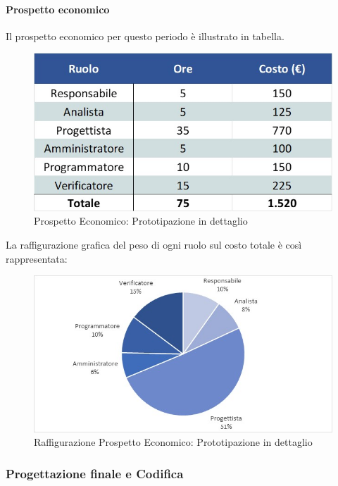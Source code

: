 \paragraph{Prospetto economico}
Il prospetto economico per questo periodo è illustrato in tabella. 
\begin{figure}[H]
	\centerline{\includegraphics[scale=0.7]{img/Preventivo/PrototipazioneDettaglioEconomico.jpg}}
	\caption{Prospetto Economico: Prototipazione in dettaglio}
	\clearpage
\end{figure}
La raffigurazione grafica del peso di ogni ruolo sul costo totale è così rappresentata:
\begin{figure}[H]
	\centerline{\includegraphics[scale=0.9]{img/Preventivo/Torte/PrototipazioneDettaglio.jpg}}
	\caption{Raffigurazione Prospetto Economico: Prototipazione in dettaglio}
	\clearpage
\end{figure} 
\newpage
\subsubsection{Progettazione finale e Codifica}
